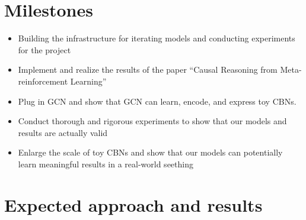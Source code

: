 \documentclass{article}
\begin{document}
\section{Milestones}
\begin{itemize}
  \item Building the infrastructure for iterating models and conducting experiments for the project
  \item Implement and realize the results of the paper “Causal Reasoning from Meta-reinforcement Learning”
  \item Plug in GCN and show that GCN can learn, encode, and express toy CBNs.
  \item Conduct thorough and rigorous experiments to show that our models and results are actually valid
  \item Enlarge the scale of toy CBNs and show that our models can potentially learn meaningful results in a real-world seething
\end{itemize}

\section{Expected approach and results}

  
 
\end{document}
